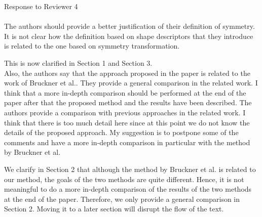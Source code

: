 \documentclass[10pt]{article}
\begin{document}
{\noindent \LARGE Response to Reviewer 4}\\\\
   The authors should provide a better justification of their definition of
   symmetry. It is not clear how the definition based on shape descriptors
   that they introduce is related to the one based on symmetry
   transformation. 

   {\color{blue}This is now clarified in Section 1 and Section 3.}\\

   Also, the authors say that the approach proposed in the paper is related
   to the work of Bruckner et al.. They provide a general comparison in the
   related work. I think that a more in-depth comparison should be performed
   at the end of the paper after that the proposed method and the results
   have been described.
   The authors provide a comparison with previous approaches in the related
   work. I think that there is too much detail here since at this point we
   do not know the details of the proposed approach. My suggestion is to
   postpone some of the comments and have a more in-depth comparison in
   particular with the method by Bruckner et al.

   {\color{blue}We clarify in Section 2 that although the method by Bruckner et al.
	   is related to our method, the goals of the two methods are quite different.
	   Hence, it is not meaningful to do a more in-depth comparison of the results
	   of the two methods at the end of the paper. Therefore, we only provide
	   a general comparison in Section 2. Moving it to a later section will
   disrupt the flow of the text.}
\end{document}
